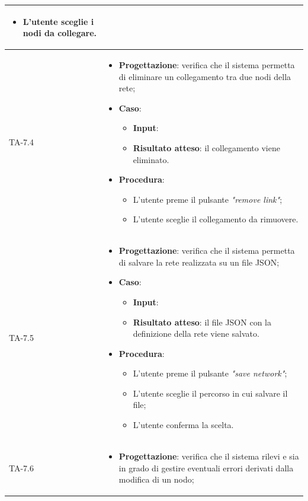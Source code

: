 \begin{longtable}{|C{2.5cm}|C{13cm}|}
\begin{itemize}
\begin{itemize}
		\item L'utente sceglie i nodi da collegare.
	\end{itemize} 
\end{itemize} \\
\hline
{TA-7.4} &
\begin{itemize}
	\item \textbf{Progettazione}: verifica che il sistema permetta di eliminare un collegamento tra due nodi della rete;
	\item \textbf{Caso}: 
	\begin{itemize}
		\item \textbf{Input}: 
		\item \textbf{Risultato atteso}: il collegamento viene eliminato.
	\end{itemize}
	\item \textbf{Procedura}:
	\begin{itemize}
		\item L'utente preme il pulsante \emph{"remove link"};
		\item L'utente sceglie il collegamento da rimuovere.
	\end{itemize} 
\end{itemize}\\
\hline
{TA-7.5} &
\begin{itemize}
	\item \textbf{Progettazione}: verifica che il sistema permetta di salvare la rete realizzata su un file JSON;
	\item \textbf{Caso}: 
	\begin{itemize}
		\item \textbf{Input}:
		\item \textbf{Risultato atteso}: il file JSON con la definizione della rete viene salvato.
	\end{itemize}
	\item \textbf{Procedura}:
	\begin{itemize}
		\item L'utente preme il pulsante \emph{"save network"};
		\item L'utente sceglie il percorso in cui salvare il file;
		\item L'utente conferma la scelta.
	\end{itemize} 
\end{itemize} \\
\hline
{TA-7.6} &
\begin{itemize}
	\item \textbf{Progettazione}: verifica che il sistema rilevi e sia in grado di gestire eventuali errori derivati dalla modifica di un nodo;

\end{itemize}
\end{longtable}
